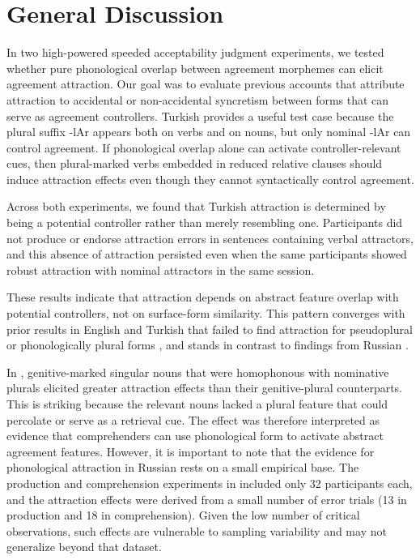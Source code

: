 \documentclass[
  authoryear,
  3p]{elsarticle}
\begin{document}
\section{General Discussion}\label{general-discussion}

In two high-powered speeded acceptability judgment experiments, we
tested whether pure phonological overlap between agreement morphemes can
elicit agreement attraction. Our goal was to evaluate previous accounts
that attribute attraction to accidental or non-accidental syncretism
between forms that can serve as agreement controllers. Turkish provides
a useful test case because the plural suffix -lAr appears both on verbs
and on nouns, but only nominal -lAr can control agreement. If
phonological overlap alone can activate controller-relevant cues, then
plural-marked verbs embedded in reduced relative clauses should induce
attraction effects even though they cannot syntactically control
agreement.

Across both experiments, we found that Turkish attraction is determined
by being a potential controller rather than merely resembling one.
Participants did not produce or endorse attraction errors in sentences
containing verbal attractors, and this absence of attraction persisted
even when the same participants showed robust attraction with nominal
attractors in the same session.

These results indicate that attraction depends on abstract feature
overlap with potential controllers, not on surface-form similarity. This
pattern converges with prior results in English and Turkish that failed
to find attraction for pseudoplural or phonologically plural forms
\citep{BockEberhard1993, HaskellMacDonald2003, NicolEtAl:2016}, and
stands in contrast to findings from Russian \citep{Slioussar2018}.

In \citet{Slioussar2018}, genitive-marked singular nouns that were
homophonous with nominative plurals elicited greater attraction effects
than their genitive-plural counterparts. This is striking because the
relevant nouns lacked a plural feature that could percolate or serve as
a retrieval cue. The effect was therefore interpreted as evidence that
comprehenders can use phonological form to activate abstract agreement
features. However, it is important to note that the evidence for
phonological attraction in Russian rests on a small empirical base. The
production and comprehension experiments in \citep{Slioussar2018}
included only 32 participants each, and the attraction effects were
derived from a small number of error trials (13 in production and 18 in
comprehension). Given the low number of critical observations, such
effects are vulnerable to sampling variability and may not generalize
beyond that dataset.
\end{document}
